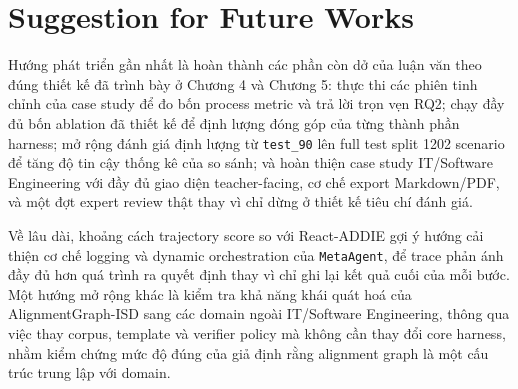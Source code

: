 \documentclass[../main.tex]{subfiles}
\begin{document}
\section{Suggestion for Future Works}

Hướng phát triển gần nhất là hoàn thành các phần còn dở của luận văn theo đúng thiết kế đã trình bày ở Chương 4 và Chương 5: thực thi các phiên tinh chỉnh của case study để đo bốn process metric và trả lời trọn vẹn RQ2; chạy đầy đủ bốn ablation đã thiết kế để định lượng đóng góp của từng thành phần harness; mở rộng đánh giá định lượng từ \texttt{test\_90} lên full test split 1202 scenario để tăng độ tin cậy thống kê của so sánh; và hoàn thiện case study IT/Software Engineering với đầy đủ giao diện teacher-facing, cơ chế export Markdown/PDF, và một đợt expert review thật thay vì chỉ dừng ở thiết kế tiêu chí đánh giá.

Về lâu dài, khoảng cách trajectory score so với React-ADDIE gợi ý hướng cải thiện cơ chế logging và dynamic orchestration của \texttt{MetaAgent}, để trace phản ánh đầy đủ hơn quá trình ra quyết định thay vì chỉ ghi lại kết quả cuối của mỗi bước. Một hướng mở rộng khác là kiểm tra khả năng khái quát hoá của AlignmentGraph-ISD sang các domain ngoài IT/Software Engineering, thông qua việc thay corpus, template và verifier policy mà không cần thay đổi core harness, nhằm kiểm chứng mức độ đúng của giả định rằng alignment graph là một cấu trúc trung lập với domain.
\end{document}
